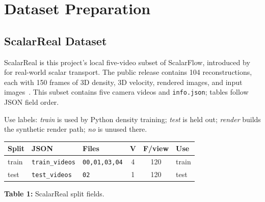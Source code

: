 \section{Dataset Preparation}\label{sec:dataset-preparation}

\subsection{ScalarReal Dataset}\label{subsec:scalarreal-dataset}

ScalarReal is this project's local five-video subset of ScalarFlow, introduced by \citet{eckert2019scalarflow} for real-world scalar transport. The public release contains 104 reconstructions, each with 150 frames of 3D density, 3D velocity, rendered images, and input images~\citep{scalarflowData2019}. This subset contains five camera videos and \texttt{info.json}; tables follow JSON field order.

Use labels: \emph{train} is used by Python density training; \emph{test} is held out; \emph{render} builds the synthetic render path; \emph{no} is unused there.

\begin{center}
    \begingroup
    \scriptsize
    \renewcommand{\arraystretch}{1.1}
    \setlength{\tabcolsep}{3pt}
    \begin{tabularx}{\columnwidth}{@{}ll>{\raggedright\arraybackslash}Xccl@{}}
        \toprule
        \textbf{Split} & \textbf{JSON} & \textbf{Files} & \textbf{V} & \textbf{F/view} & \textbf{Use} \\
        \midrule
        train & \texttt{train\_videos} & \texttt{00,01,03,04} & 4 & 120 & train \\
        test & \texttt{test\_videos} & \texttt{02} & 1 & 120 & test \\
        \bottomrule
    \end{tabularx}
    \par\smallskip
    \footnotesize\textbf{Table 1:} ScalarReal split fields.
    \endgroup
\end{center}

